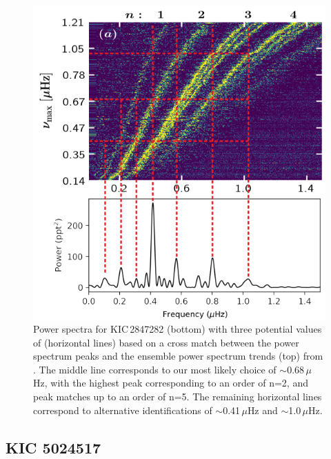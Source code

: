 \begin{figure}
    \centering
    \includegraphics[width=0.6\linewidth]{Chapter5/mode_id_MG.png}
    \caption[Power spectra with possible mode identifications for KIC\,2847282]{Power spectra for KIC\,2847282 (bottom) with three potential values of \numax{} (horizontal lines) based on a cross match between the power spectrum peaks and the ensemble power spectrum trends (top) from \cite{yu_asteroseismology_2020}. The middle line corresponds to our most likely choice of \numax{}$\sim$0.68\,$\mu$Hz, with the highest peak corresponding to an order of n=2, and peak matches up to an order of n=5. The remaining horizontal lines correspond to alternative identifications of \numax{}$\sim$0.41\,$\mu$Hz and \numax{}$\sim$1.0\,$\mu$Hz.}
    \label{fig:2847282_ps}
\end{figure}

\subsection{KIC 5024517}

